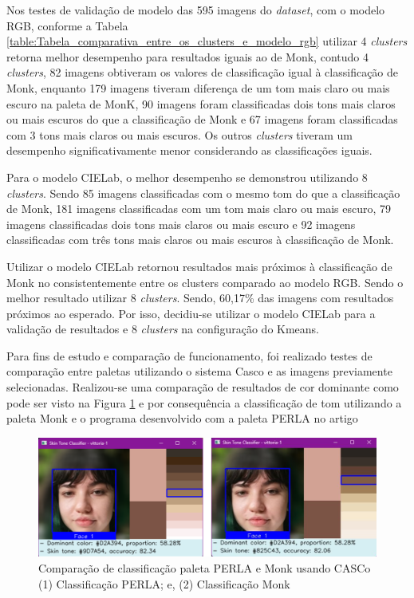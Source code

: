 Nos testes de validação de modelo das 595 imagens do \textit{dataset}, com o modelo RGB, conforme a Tabela \ref{table:Tabela_comparativa_entre_os_clusters_e_modelo_rgb} utilizar 4 \textit{clusters} retorna melhor desempenho para resultados iguais ao de Monk, contudo 4 \textit{clusters}, 82 imagens obtiveram os valores de classificação igual à classificação de Monk, enquanto 179 imagens tiveram diferença de um tom mais claro ou mais escuro na paleta de MonK, 90 imagens foram classificadas dois tons mais claros ou mais escuros do que a classificação de Monk e 67 imagens foram classificadas com 3 tons mais claros ou mais escuros. Os outros \textit{clusters} tiveram um desempenho significativamente menor considerando as classificações iguais.

Para o modelo CIELab, o melhor desempenho se demonstrou utilizando 8 \textit{clusters}. Sendo 85 imagens classificadas com o mesmo tom do que a classificação de Monk, 181 imagens classificadas com um tom mais claro ou mais escuro, 79 imagens classificadas dois tons mais claros ou mais escuro e 92 imagens classificadas com três tons mais claros ou mais escuros à classificação de Monk. 

Utilizar o modelo CIELab retornou resultados mais próximos à classificação de Monk no consistentemente entre os clusters comparado ao modelo RGB. Sendo o melhor resultado utilizar 8 \textit{clusters}. Sendo, 60,17\% das imagens com resultados próximos ao esperado. Por isso, decidiu-se utilizar o modelo CIELab para a validação de resultados e 8 \textit{clusters} na configuração do Kmeans.

Para fins de estudo e comparação de funcionamento, foi realizado testes de comparação entre paletas utilizando o sistema Casco e as imagens previamente selecionadas. Realizou-se uma comparação de resultados de cor dominante como pode ser visto na Figura \ref{fig:x PerlavsMonk} e por consequência a classificação de tom utilizando a paleta Monk e o programa desenvolvido com a paleta PERLA no artigo \cite{Classification_Algorithm_for_Skin_Color_CASCo_A_new_tool}

\begin{figure}[h]
\centering
\caption{Comparação de classificação paleta PERLA e Monk usando CASCo (1) Classificação PERLA; e, (2) Classificação Monk}
\includegraphics[scale=0.75]{Template_Latex_TCC-UNIFTEC/_lib/imagens/perlavsmonk.png}

\label{fig:x PerlavsMonk}
\end{figure}

